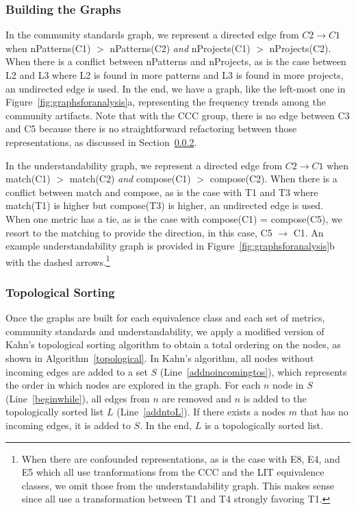 \subsubsection{Building the Graphs}
In the community standards graph, we represent a directed edge from $C2 \rightarrow C1$ when  nPatterns(C1) $>$ nPatterns(C2) \emph{and}  nProjects(C1) $>$ nProjects(C2). When there is a conflict between nPatterns and nProjects, as is the case between L2 and L3 where L2 is found in more patterns and L3 is found in more projects, an undirected edge is used. In the end, we have a graph, like the left-most one in Figure~\ref{fig:graphsforanalysis}a, representing the frequency trends among the community artifacts. Note that with the CCC group, there is no edge between C3 and C5 because there is no straightforward refactoring between those representations, as discussed in Section~\ref{}. 

In the understandability graph, we represent a directed edge from $C2 \rightarrow C1$ when match(C1) $>$ match(C2) \emph{and} compose(C1) $>$ compose(C2). When there is a conflict between match and compose, as is the case with T1 and T3 where match(T1) is higher but compose(T3) is higher, an undirected edge is used. When one metric has a tie, as is the case with compose(C1) = compose(C5), we resort to the matching to provide the direction, in this case, C5 $\rightarrow$ C1. An example understandability graph is provided in Figure~\ref{fig:graphsforanalysis}b with the dashed arrows.\footnote{When there are confounded representations, as is the case with E8, E4, and E5 which all use tranformations from the CCC and the LIT equivalence classes, we omit those from the understandability graph. This makes sense since all use a transformation between T1 and T4 strongly favoring T1. }

\subsubsection{Topological Sorting}
Once the graphs are built for each equivalence class and each set of metrics, community standards and understandability, we apply a modified version of Kahn's topological sorting algorithm to obtain a total ordering on the nodes, as shown in Algorithm~\ref{topological}. In Kahn's algorithm, all nodes without incoming edges are added to a set $S$ (Line~\ref{addnoincomingtos}), which represents the order in which nodes are explored in the graph. For each $n$ node in $S$ (Line~\ref{beginwhile}), all edges from $n$ are removed and $n$ is added to the topologically sorted list $L$ (Line~\ref{addntoL}). If there exists a nodes $m$ that has no incoming edges, it is added to $S$.  In the end, $L$ is a topologically sorted list. 

